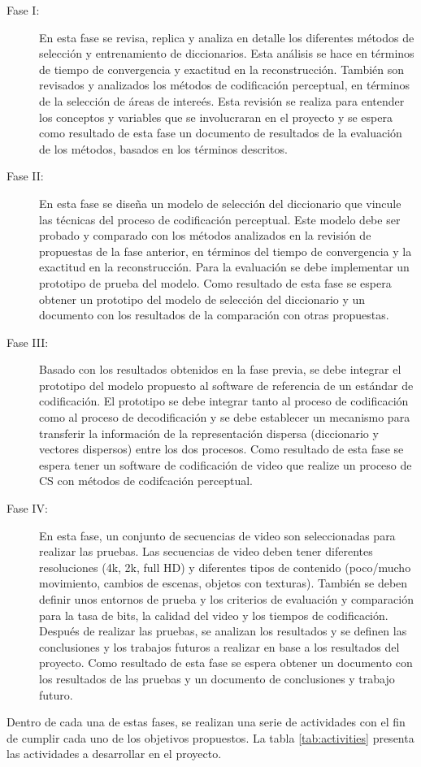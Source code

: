 \begin{description}
\item[Fase I:] En esta fase se revisa, replica y analiza en detalle los diferentes m\'etodos de selecci\'on y entrenamiento de diccionarios. Esta an\'alisis se hace en t\'erminos de tiempo de convergencia y exactitud en la reconstrucci\'on. Tambi\'en son revisados y analizados los m\'etodos de codificaci\'on perceptual, en t\'erminos de la selecci\'on de \'areas de  intere\'es. Esta revisi\'on se realiza para entender los conceptos y variables que se involucraran en el proyecto y se espera como resultado de esta fase un documento de resultados de la evaluaci\'on de los m\'etodos, basados en los t\'erminos descritos.  
\item[Fase II:] En esta fase se dise\~na un  modelo de selecci\'on del diccionario que vincule las t\'ecnicas del proceso de codificaci\'on perceptual. Este modelo debe ser probado y comparado con los m\'etodos analizados en la revisi\'on de propuestas de la fase anterior, en t\'erminos del tiempo de convergencia y la exactitud en la reconstrucci\'on. Para la evaluaci\'on se debe implementar un prototipo de prueba del modelo. Como resultado de esta fase se espera obtener un prototipo del modelo de selecci\'on del diccionario y un documento con los resultados de la comparaci\'on con otras propuestas. 
\item[Fase III:] Basado con los resultados obtenidos en la fase previa, se debe integrar el prototipo del modelo propuesto al software de referencia de un est\'andar de codificaci\'on. El prototipo se debe integrar tanto al proceso de codificaci\'on como al proceso de decodificaci\'on y se debe establecer un mecanismo para transferir la informaci\'on de la representaci\'on dispersa (diccionario y vectores dispersos) entre los dos procesos.  Como resultado de esta fase se espera tener un software de codificaci\'on de video que realize un proceso de CS con m\'etodos de codifcaci\'on perceptual.

\item[Fase IV:] En esta fase, un conjunto de secuencias de video son seleccionadas para realizar las pruebas. Las secuencias de video deben tener diferentes resoluciones (4k, 2k, full HD) y diferentes tipos de contenido (poco/mucho movimiento, cambios de escenas, objetos con texturas). Tambi\'en se deben definir unos entornos de prueba y los criterios de evaluaci\'on y comparaci\'on para la tasa de bits, la calidad del video y los tiempos de codificaci\'on. Despu\'es de realizar las pruebas, se analizan los resultados y se definen las conclusiones y los trabajos futuros a realizar en base a los resultados del proyecto. Como resultado de esta fase se espera obtener un documento con los resultados de las pruebas y un documento de conclusiones y trabajo futuro.
\end{description}
Dentro de cada una de estas fases, se realizan una serie de actividades con el fin de cumplir cada uno de los objetivos propuestos. La tabla \ref{tab:activities} presenta las actividades a desarrollar en el proyecto.


